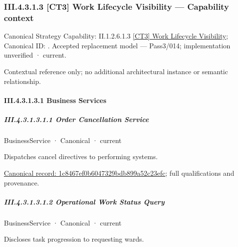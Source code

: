 \subsubsection*{III.4.3.1.3 [CT3] Work Lifecycle Visibility — Capability context}
\label{navigation:III.4.3.1.3}

{\small Canonical Strategy Capability: II.1.2.6.1.3 \hyperref[element:5239aba7e072422686d108950a5b0d50]{[CT3] Work Lifecycle Visibility}; Canonical ID: \texttt{}. Accepted replacement model — Pass3/014; implementation unverified · current.}\par
Contextual reference only; no additional architectural instance or semantic relationship.\par
\paragraph*{III.4.3.1.3.1 Business Services}
\label{navigation:III.4.3.1.3.1}

\subparagraph*{III.4.3.1.3.1.1 Order Cancellation Service}
\label{navigation:III.4.3.1.3.1.1}

\label{element:1c8467ef0b6047329bdb899a52c23efc}
{\small BusinessService · Canonical · current}\par

Dispatches cancel directives to performing systems.


{\footnotesize \href{../../../../../../../../continuum/business/business-service/1c8467ef0b6047329bdb899a52c23efc.md}{Canonical record: 1c8467ef0b6047329bdb899a52c23efc}; full qualifications and provenance.}\par
\subparagraph*{III.4.3.1.3.1.2 Operational Work Status Query}
\label{navigation:III.4.3.1.3.1.2}

\label{element:8659408923e641b99727ef218e2b8dfc}
{\small BusinessService · Canonical · current}\par

Discloses task progression to requesting wards.


